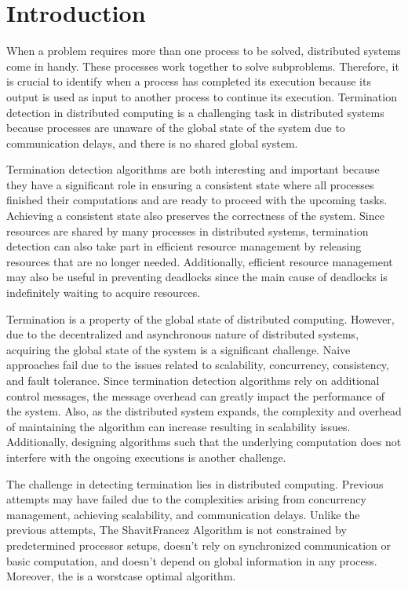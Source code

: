 \documentclass[letterpaper,10pt,english]{sphinxmanual}
\begin{document}
\section{Introduction}
\label{\detokenize{docs/ShavitFrancez/introduction:introduction}}\label{\detokenize{docs/ShavitFrancez/introduction::doc}}
\sphinxAtStartPar
When a problem requires more than one process to be solved, distributed systems come in handy. These processes work together to solve subproblems. Therefore, it is crucial to identify when a process has completed its execution because its output is used as input to another process to continue its execution. Termination detection in distributed computing is a challenging task in distributed systems because processes are unaware of the global state of the system due to communication delays, and there is no shared global system.

\sphinxAtStartPar
Termination detection algorithms are both interesting and important because they have a significant role in ensuring a consistent state where all processes finished their computations and are ready to proceed with the upcoming tasks. Achieving a consistent state also preserves the correctness of the system. Since resources are shared by many processes in distributed systems, termination detection can also take part in efficient resource management by releasing resources that are no longer needed. Additionally, efficient resource management may  also be useful in preventing deadlocks since the main cause of deadlocks is indefinitely waiting to acquire resources.

\sphinxAtStartPar
Termination is a property of the global state of distributed computing. However, due to the decentralized and asynchronous nature of distributed systems, acquiring the global state of the system is a significant challenge. Naive approaches fail due to the issues related to scalability, concurrency, consistency, and fault tolerance. Since termination detection algorithms rely on additional control messages, the message overhead can greatly impact the performance of the system. Also, as the distributed system expands, the complexity and overhead of maintaining the algorithm can increase resulting in scalability issues. Additionally, designing algorithms such that the underlying computation does not interfere with the ongoing executions is another challenge.

\sphinxAtStartPar
The challenge in detecting termination lies in distributed computing. Previous attempts may have failed due to the complexities arising from concurrency management, achieving scalability, and communication delays. Unlike the previous attempts, The Shavit\sphinxhyphen{}Francez Algorithm is not constrained by predetermined processor setups, doesn’t rely on synchronized communication or basic computation, and doesn’t depend on global information in any process.  Moreover, the {\hyperref[\detokenize{docs/ShavitFrancez/algorithm:shavitfrancezterminationdetectionalgorithm}]{}} is a worst\sphinxhyphen{}case optimal algorithm.
\end{document}
